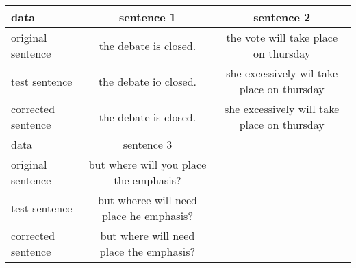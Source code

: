 \documentclass[a4paper]{article}
\begin{document}
\begin{center}
  \begin{tabular}{ l | c | c }
    \hline
    data & sentence 1 & sentence 2\\ \hline
    original sentence & the debate is closed. & the vote will take place on
    thursday \\
    \hline test sentence & the debate io closed. & she excessively wil take
    place on thursday\\
    \hline corrected sentence & the debate is closed. & she excessively will
    take place on thursday\\
    \hline\hline
    data & sentence 3 &\\ \hline
    original sentence & but where will you place the emphasis? & \\ \hline
    test sentence & but wheree will need place he emphasis? & \\ \hline
    corrected sentence & but where will need place the emphasis? & \\ \hline
  \end{tabular}
\end{center}
\end{document}

